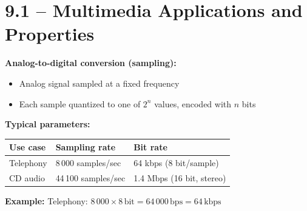 \section{9.1 -- Multimedia Applications and Properties}

\begin{tcolorbox}[keybox, title=Audio -- Digitization]
\textbf{Analog-to-digital conversion (sampling):}
\begin{itemize}[nosep]
  \item Analog signal sampled at a fixed frequency
  \item Each sample quantized to one of $2^n$ values, encoded with $n$ bits
\end{itemize}

\medskip
\textbf{Typical parameters:}
\begin{center}
\begin{tabular}{lll}
\toprule
\textbf{Use case} & \textbf{Sampling rate} & \textbf{Bit rate} \\
\midrule
Telephony & 8\,000 samples/sec & 64 kbps (8 bit/sample) \\
CD audio & 44\,100 samples/sec & 1.4 Mbps (16 bit, stereo) \\
\bottomrule
\end{tabular}
\end{center}

\medskip
\textbf{Example:} Telephony: $8\,000 \times 8\,\text{bit} = 64\,000\,\text{bps} = 64\,\text{kbps}$
\end{tcolorbox}

